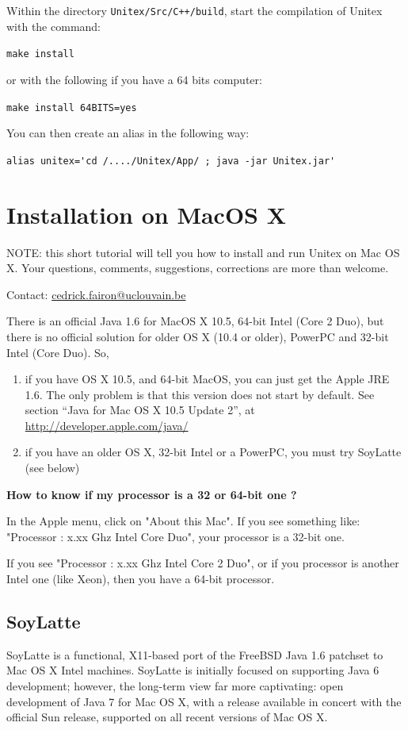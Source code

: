 \bigskip
\noindent Within the directory \verb|Unitex/Src/C++/build|, start the compilation
of Unitex with the command:

\bigskip \verb+make install+

\bigskip
\noindent or with the following if you have a 64 bits computer:
 
\bigskip \verb+make install 64BITS=yes+

\bigskip
\noindent You can then create an alias in the following way:

\bigskip \verb$alias unitex='cd /..../Unitex/App/ ; java -jar Unitex.jar'$


\section{Installation on MacOS X}
\label{section-macos-install}
\noindent NOTE: this short tutorial will tell you how to install and run 
Unitex on Mac OS X. Your questions, comments, suggestions, 
corrections are more than welcome. 

\noindent Contact: \url{cedrick.fairon@uclouvain.be}

\bigskip
\noindent There is an official Java 1.6 for MacOS X 10.5, 64-bit Intel 
(Core 2 Duo), but there is no official solution for older OS X (10.4 or older),
PowerPC and 32-bit Intel (Core Duo). So,
\begin{enumerate}
    \item if you have OS X 10.5, and 64-bit MacOS, you can just get the
    Apple JRE 1.6. The only problem is that this version does not start by
    default. See section ``Java for Mac OS X 10.5 Update 2'', 
    at \url{http://developer.apple.com/java/}

    \item if you have an older OS X, 32-bit Intel or a PowerPC, you must try
    SoyLatte (see below)
\end{enumerate}

\noindent\textbf{How to know if my processor is a 32 or 64-bit one ?}

\noindent In the Apple menu, click on "About this Mac". If you see something
like: "Processor : x.xx Ghz Intel Core Duo", your processor is a 32-bit one.

\bigskip
\noindent If you see "Processor : x.xx Ghz Intel Core 2 Duo", or if you
processor is another Intel one (like Xeon), then you have a 64-bit processor.


\subsection{SoyLatte}
\bigskip{}
\noindent SoyLatte is a functional, X11-based port of the FreeBSD
Java 1.6 patchset to Mac OS X Intel machines. SoyLatte is initially focused on 
supporting Java 6 development; however, the long-term view far more captivating: 
open development of Java 7 for Mac OS X, with a release available in concert 
with the official Sun release, supported on all recent versions of Mac OS X.

